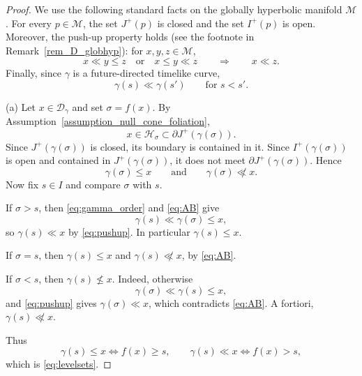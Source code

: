\documentclass[12pt,reqno]{amsart}
\numberwithin{equation}{section}
\theoremstyle{definition}
\theoremstyle{plain}
\theoremstyle{definition}
\theoremstyle{definition}
\newcommand{\M}{\mathcal{M}}
\newcommand{\D}{\mathcal{D}}
\newcommand{\dg}{\D_\gamma}
\begin{document}
\begin{proof}
We use the following standard facts on the globally hyperbolic manifold $\M$ \cite{oneill1983}. For every $p\in\M$, the set $J^+(p)$ is closed and the set $I^+(p)$ is open. Moreover, the push-up property holds (see the footnote in Remark~\ref{rem_D_globhyp}): for $x,y,z\in\M$,
\begin{equation}\label{eq:pushup}
x\ll y\le z
\quad\text{or}\quad
x\le y\ll z
\qquad\Longrightarrow\qquad
x\ll z.
\end{equation}
Finally, since $\gamma$ is a future-directed timelike curve,
\begin{equation}\label{eq:gamma_order}
\gamma(s)\ll\gamma(s')\qquad\text{for } s<s'.
\end{equation}

(a) Let $x\in\dg$ and set $\sigma=f(x)$. By Assumption~\ref{assumption_null_cone_foliation},
\begin{equation*}
x\in\mathcal H_\sigma\subset\partial J^+(\gamma(\sigma)).
\end{equation*}
Since $J^+(\gamma(\sigma))$ is closed, its boundary is contained in it. Since $I^+(\gamma(\sigma))$ is open and contained in $J^+(\gamma(\sigma))$, it does not meet $\partial J^+(\gamma(\sigma))$. Hence
\begin{equation}\label{eq:AB}
\gamma(\sigma)\le x
\qquad\text{and}\qquad
\gamma(\sigma)\not\ll x.
\end{equation}
Now fix $s\in I$ and compare $\sigma$ with $s$.

If $\sigma>s$, then \eqref{eq:gamma_order} and \eqref{eq:AB} give
\begin{equation*}
\gamma(s)\ll\gamma(\sigma)\le x,
\end{equation*}
so $\gamma(s)\ll x$ by \eqref{eq:pushup}. In particular $\gamma(s)\le x$.

If $\sigma=s$, then $\gamma(s)\le x$ and $\gamma(s)\not\ll x$, by \eqref{eq:AB}.

If $\sigma<s$, then $\gamma(s)\not\le x$. Indeed, otherwise
\begin{equation*}
\gamma(\sigma)\ll\gamma(s)\le x,
\end{equation*}
and \eqref{eq:pushup} gives $\gamma(\sigma)\ll x$, which contradicts \eqref{eq:AB}. A fortiori, $\gamma(s)\not\ll x$.

Thus
\begin{equation*}
\gamma(s)\le x\iff f(x)\ge s,
\qquad
\gamma(s)\ll x\iff f(x)>s,
\end{equation*}
which is \eqref{eq:levelsets}.


\end{proof}
\end{document}

